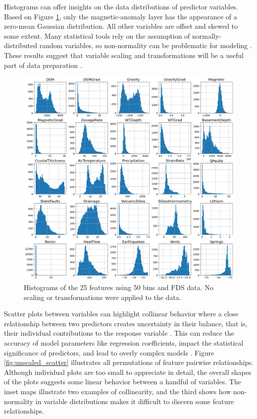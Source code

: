 Histograms can offer insights on the data distributions of predictor variables. Based on Figure \ref{fig:unscaled_hists}, only the magnetic-anomaly layer has the appearance of a zero-mean Gaussian distribution. All other variables are offset and skewed to some extent. Many statistical tools rely on the assumption of normally-distributed random variables, so non-normality can be problematic for modeling \citep[p.\ 85]{montgomery_statistical_2012}. These results suggest that variable scaling and transformations will be a useful part of data preparation \citep[p.\ 221]{montgomery_statistical_2012}. 

\begin{figure}[!htp]
\centering
\includegraphics[width=\textwidth]{templates/images/Figure-Unscaled_Histograms.png}
\caption[Unconditioned FDS histograms]{Histograms of the 25 features using 50 bins and FDS data. No scaling or transformations were applied to the data.}
\label{fig:unscaled_hists}
\end{figure}

Scatter plots between variables can highlight collinear behavior where a close relationship between two predictors creates uncertainty in their balance, that is, their individual contributions to the response variable \citep[p.\ 99]{james_introduction_2013}. This can reduce the accuracy of model parameters like regression coefficients, impact the statistical significance of predictors, and lead to overly complex models \citep[p.\ 100-101]{james_introduction_2013}. Figure \ref{fig:unscaled_scatter} illustrates all permutations of feature pairwise relationships. Although individual plots are too small to appreciate in detail, the overall shapes of the plots suggests some linear behavior between a handful of variables. The inset maps illustrate two examples of collinearity, and the third shows how non-normality in variable distributions makes it difficult to discern some feature relationships.

